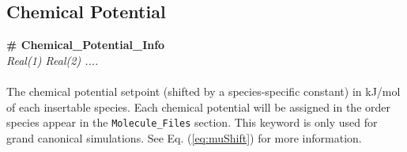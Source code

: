 \subsection{Chemical Potential}\label{sec:Chemical_Potential}
{\bf \# Chemical\_Potential\_Info} \\
{\it Real(1) Real(2) ....} \\ \\
%
The chemical potential setpoint (shifted by a species-specific constant) 
in kJ/mol of each insertable species. 
Each chemical potential will be assigned in the order species appear in 
the \texttt{Molecule\_Files} section. 
This keyword is only used for grand canonical simulations.
See Eq. (\ref{eq:muShift}) for more information.

%
%
%
%
%
%
%
